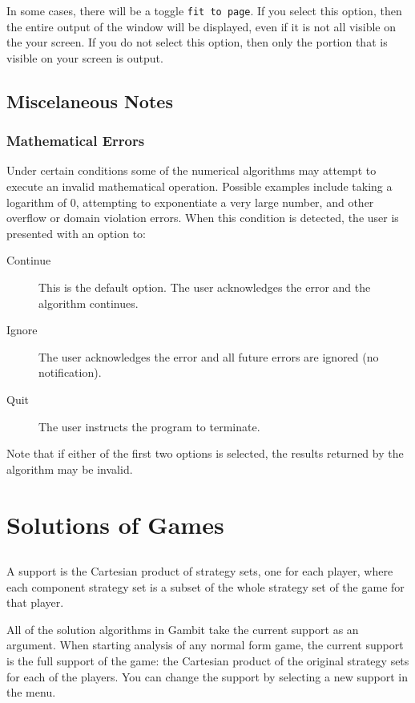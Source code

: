 {In some cases, there will be a toggle \verb+fit to page+.  If you select 
this option, then the entire output of the window 
will be displayed, even if it is not all 
visible on the your screen.  If you do not select this option, then only 
the portion that is visible on your screen is output.  

\section{Miscelaneous Notes}
\subsection{Mathematical Errors}
Under certain conditions some of the numerical algorithms may attempt to
execute an invalid mathematical operation.  Possible examples include
taking a logarithm of 0, attempting to exponentiate a very large number, and
other overflow or domain violation errors.  When this condition is detected,
the user is presented with an option to:
\begin{description}
\item[Continue] This is the default option.  The user acknowledges the error
and the algorithm continues.
\item[Ignore] The user acknowledges the error and all future errors are
ignored (no notification).
\item[Quit] The user instructs the program to terminate.
\end{description}

Note that if either of the first two options is selected, the results 
returned by the algorithm may be invalid.

\chapter{Solutions of Games}

\section{}\label{supportsec}

A support is the Cartesian product of strategy sets, one for each player, 
where  each component strategy set is a subset of the whole strategy 
set of the game for that player.  

All of the solution algorithms in Gambit take the current support as an 
argument.  When starting analysis of any normal form game,  the current 
support is the full support of the game:  the Cartesian product of the original 
strategy sets for each of the players.  You can change the support by 
selecting a new support in the  menu.  

}
